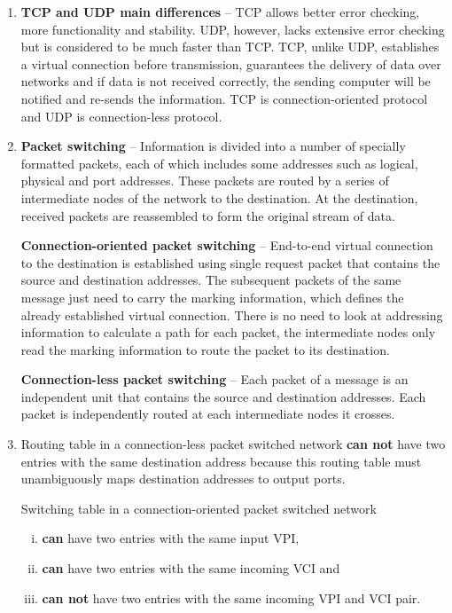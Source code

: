 \documentclass[a4paper, 11pt]{article}
\begin{document}
\begin{enumerate}
		\item %
			\textbf{TCP and UDP main differences} -- TCP allows better error checking, more functionality and stability.
			UDP, however, lacks extensive error checking but is considered to be much faster than TCP.
			TCP, unlike UDP, establishes a virtual connection before transmission, guarantees the delivery of data over
			networks and if data is not received correctly, the sending computer will be notified and re-sends the
			information. TCP is connection-oriented protocol and UDP is connection-less protocol.

		\item %
			\textbf{Packet switching} -- Information is divided into a number of specially formatted packets, each of
			which includes some addresses such as logical, physical and port addresses. These packets are routed by a
			series of intermediate nodes of the network to the destination. At the destination, received packets are
			reassembled to form the original stream of data.

			\textbf{Connection-oriented packet switching} -- End-to-end virtual connection to the destination is
			established using single request packet that contains the source and destination addresses. The subsequent
			packets of the same message just need to carry the marking information, which defines the already
			established virtual connection. There is no need to look at addressing information to calculate a path for
			each packet, the intermediate nodes only read the marking information to route the packet to its
			destination.

			\textbf{Connection-less packet switching} -- Each packet of a message is an independent unit that contains
			the source and destination addresses. Each packet is independently routed at each intermediate nodes it
			crosses.

		\item %
			Routing table in a connection-less packet switched network \textbf{can not} have two entries with the same
			destination address because this routing table must unambiguously maps destination addresses to output
			ports.

			Switching table in a connection-oriented packet switched network
			\begin{enumerate}[i)]
				\item \textbf{can} have two entries with the same input VPI, %
				\item \textbf{can} have two entries with the same incoming VCI and %
				\item \textbf{can not} have two entries with the same incoming VPI and VCI pair. %
			\end{enumerate}


\end{enumerate}
\end{document}
